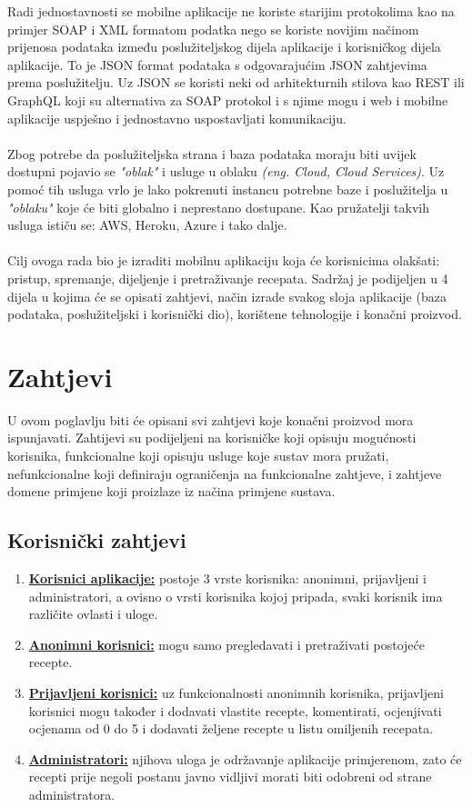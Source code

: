 \documentclass[times, utf8, zavrsni]{fer}
\begin{document}
Radi jednostavnosti se mobilne aplikacije ne koriste starijim protokolima kao na primjer
SOAP i XML formatom podatka nego se koriste novijim načinom prijenosa
podataka između poslužiteljskog dijela aplikacije i korisničkog dijela aplikacije.
To je JSON format podataka s odgovarajućim JSON zahtjevima prema poslužitelju.
Uz JSON se koristi neki od arhitekturnih stilova kao REST ili GraphQL koji su alternativa
za SOAP protokol i s njime mogu i web i mobilne aplikacije uspješno i jednostavno uspostavljati komunikaciju.
\\\\
Zbog potrebe da poslužiteljska strana i baza podataka moraju biti uvijek dostupni
pojavio se \textit{"oblak"} i usluge u oblaku \textit{(eng. Cloud, Cloud Services)}.
Uz pomoć tih usluga vrlo je lako pokrenuti instancu potrebne baze i poslužitelja
u \textit{"oblaku"} koje će biti globalno i neprestano dostupane. Kao pružatelji takvih usluga ističu se:
AWS, Heroku, Azure i tako dalje.
\\\\
Cilj ovoga rada bio je izraditi mobilnu aplikaciju koja će korisnicima olakšati: pristup,
spremanje, dijeljenje i pretraživanje recepata. Sadržaj je podijeljen u 4 dijela u kojima
će se opisati zahtjevi, način izrade svakog sloja aplikacije (baza podataka,
poslužiteljski i korisnički dio), korištene tehnologije i konačni proizvod.

\chapter{Zahtjevi}
U ovom poglavlju biti će opisani svi zahtjevi koje konačni proizvod
mora ispunjavati. Zahtijevi su podijeljeni na korisničke koji opisuju mogućnosti
korisnika, funkcionalne koji opisuju usluge koje sustav mora pružati, nefunkcionalne koji
definiraju ograničenja na funkcionalne zahtjeve,
i zahtjeve domene primjene koji proizlaze iz načina primjene sustava.
\section{Korisnički zahtjevi}
\begin{enumerate}
      \item \textbf{\underline{Korisnici aplikacije:}} postoje 3 vrste korisnika:
            anonimni, prijavljeni i administratori, a ovisno o vrsti korisnika kojoj pripada, svaki korisnik ima
            različite ovlasti i uloge.
      \item \textbf{\underline{Anonimni korisnici:}} mogu samo pregledavati i pretraživati
            postojeće recepte.
      \item \textbf{\underline{Prijavljeni korisnici:}} uz funkcionalnosti
            anonimnih korisnika, prijavljeni korisnici mogu također i dodavati vlastite recepte, komentirati,
            ocjenjivati ocjenama od 0 do 5 i dodavati željene recepte u listu omiljenih recepata.
      \item \textbf{\underline{Administratori:}} njihova uloga je održavanje
            aplikacije primjerenom, zato će recepti prije negoli postanu javno vidljivi
            morati biti odobreni od strane administratora.
\end{enumerate}
\end{document}
